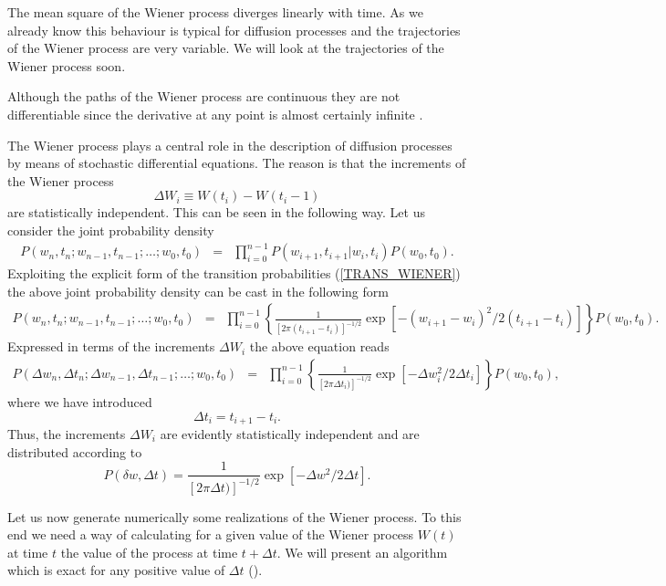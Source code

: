 The mean square of the Wiener process diverges linearly with time.
As we already know this behaviour is typical for diffusion 
processes and the trajectories of the Wiener process are very 
variable. We will look at the trajectories of the Wiener process 
soon. 

Although the paths of the Wiener process are continuous they are 
not differentiable since the derivative at any point is 
almost certainly infinite \cite{GARDINER}.

The Wiener process plays a central role in the description of 
diffusion processes by means of stochastic differential equations.
The reason is that the increments of the Wiener process
\begin{equation*}
\Delta W_i \equiv W(t_i) - W(t_i-1)
\end{equation*}
are statistically independent. This can be seen in the following 
way. Let us consider the joint probability density
\begin{eqnarray*}
P(w_n,t_n; w_{n-1},t_{n-1}; \ldots ; w_0,t_0) &=&
\prod_{i=0}^{n-1} P(w_{i+1},t_{i+1}|w_i,t_i) P(w_0,t_0).
\end{eqnarray*}
Exploiting the explicit form of the transition probabilities
(\ref{TRANS_WIENER}) the above joint probability density can be 
cast in the following form
\begin{eqnarray*}
P(w_n,t_n; w_{n-1},t_{n-1}; \ldots ; w_0,t_0) &=&
\prod_{i=0}^{n-1} 
\left\{ \frac{1}{[2 \pi (t_{i+1}-t_i)]^{-1/2}}
\exp[-(w_{i+1}-w_i)^2/2(t_{i+1}-t_i)]
\right\}
P(w_0,t_0).
\end{eqnarray*}
Expressed in terms of the increments $\Delta W_i$ the above 
equation reads
\begin{eqnarray*}
P(\Delta w_n,\Delta t_n; \Delta w_{n-1},\Delta t_{n-1}; \ldots ; w_0,t_0) &=&
\prod_{i=0}^{n-1} 
\left\{ \frac{1}{[2 \pi \Delta t_i)]^{-1/2}}
\exp[-\Delta w_i^2/2 \Delta t_i]
\right\}
P(w_0,t_0),
\end{eqnarray*}
where we have introduced
\begin{equation*}
\Delta t_i = t_{i+1} - t_i.
\end{equation*}
Thus, the increments $\Delta W_i$ are evidently statistically
independent and are distributed according to
\begin{equation*}
P(\delta w,\Delta t) = \frac{1}{[2 \pi \Delta t)]^{-1/2}}
\exp[-\Delta w^2/2 \Delta t].
\end{equation*}

Let us now generate numerically some realizations of the Wiener 
process. To this end we need a way of calculating for a given 
value of the Wiener process $W(t)$ at time $t$ the value of the
process at time $t+\Delta t$. We will present an algorithm which
is exact for any positive value of $\Delta t$ (\cite{GILLESPIE}).

